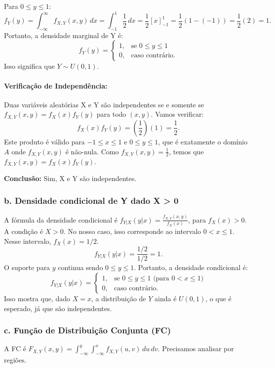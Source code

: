 \documentclass[12pt]{article}
\begin{document}
Para $0 \le y \le 1$:
\[ f_Y(y) = \int_{-\infty}^{\infty} f_{X,Y}(x,y) \,dx = \int_{-1}^{1} \frac{1}{2} \,dx = \frac{1}{2} [x]_{-1}^{1} = \frac{1}{2}(1 - (-1)) = \frac{1}{2}(2) = 1. \]
Portanto, a densidade marginal de Y é:
\[ f_Y(y) = \begin{cases} 1, & \text{se } 0 \le y \le 1 \\ 0, & \text{caso contrário.} \end{cases} \]
Isso significa que $Y \sim U(0, 1)$.

\paragraph{Verificação de Independência:}
Duas variáveis aleatórias X e Y são independentes se e somente se $f_{X,Y}(x,y) = f_X(x)f_Y(y)$ para todo $(x,y)$.
Vamos verificar:
\[ f_X(x)f_Y(y) = \left(\frac{1}{2}\right)(1) = \frac{1}{2}. \]
Este produto é válido para $-1 \le x \le 1$ e $0 \le y \le 1$, que é exatamente o domínio $A$ onde $f_{X,Y}(x,y)$ é não-nula. Como $f_{X,Y}(x,y) = \frac{1}{2}$, temos que $f_{X,Y}(x,y) = f_X(x)f_Y(y)$.

\textbf{Conclusão:} Sim, X e Y são independentes.

\subsubsection*{b. Densidade condicional de Y dado X > 0}
A fórmula da densidade condicional é $f_{Y|X}(y|x) = \frac{f_{X,Y}(x,y)}{f_X(x)}$, para $f_X(x) > 0$.
A condição é $X > 0$. No nosso caso, isso corresponde ao intervalo $0 < x \le 1$. Nesse intervalo, $f_X(x) = 1/2$.
\[ f_{Y|X}(y|x) = \frac{1/2}{1/2} = 1. \]
O suporte para $y$ continua sendo $0 \le y \le 1$.
Portanto, a densidade condicional é:
\[ f_{Y|X}(y|x) = \begin{cases} 1, & \text{se } 0 \le y \le 1 \text{ (para } 0 < x \le 1\text{)} \\ 0, & \text{caso contrário.} \end{cases} \]
Isso mostra que, dado $X=x$, a distribuição de $Y$ ainda é $U(0,1)$, o que é esperado, já que são independentes.

\subsubsection*{c. Função de Distribuição Conjunta (FC)}
A FC é $F_{X,Y}(x,y) = \int_{-\infty}^{y} \int_{-\infty}^{x} f_{X,Y}(u,v) \,du \,dv$. Precisamos analisar por regiões.
\end{document}
